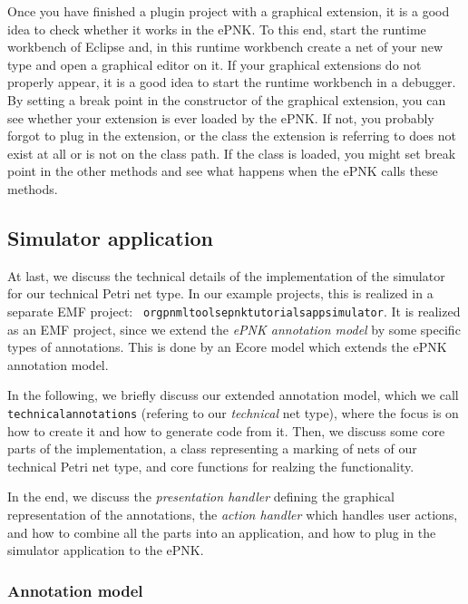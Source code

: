 Once you have finished a plugin project with a graphical extension, it is a good
idea to check whether it works in the ePNK. To this end, start the runtime
workbench of Eclipse and, in this runtime workbench create a net of your new type and
open a graphical editor on it.
If your graphical extensions do not properly appear, it is a good idea to
start the runtime workbench in a debugger. By setting a break point in the
constructor of the graphical extension, you can see whether your extension is
ever loaded by the ePNK. If not, you probably forgot to plug in the extension,
or the class the extension is referring to does not exist at all or is
not on the class path. If the class is loaded, you might set break point
in the other methods and see what happens when the ePNK calls these methods.

\subsection{Simulator application}
\label{subsec:tutorial:technical:application}

At last, we discuss the technical details of the implementation of the
simulator for our technical Petri net type. In our example projects, this
is realized in a separate EMF project: {\tt
org\qnsep{}pnml\qnsep{}tools\qnsep{}epnk\qnsep{}tutorials\qnsep{}app\qnsep{}simulator}.
It is realized as an EMF project, since we extend the \emph{ePNK
annotation model} by some specific types of annotations. This is done by an
Ecore model which extends the ePNK annotation model.

In the following, we briefly discuss our extended annotation model, which we
call {\tt technicalannotations} (refering to our \emph{technical} net type),
where the focus is on how to create it and how to generate code from it. Then,
we discuss some core parts of the implementation, a class representing a marking
of nets of our technical Petri net type, and core functions for realzing the
functionality.

In the end, we discuss the \emph{presentation handler} defining the graphical
representation of the annotations, the \emph{action handler} which handles user
actions, and how to combine all the parts into an application, and how to plug
in the simulator application to the ePNK.

\subsubsection{Annotation model}
\label{subsubsec:tutorial:technical:application:annotation}

